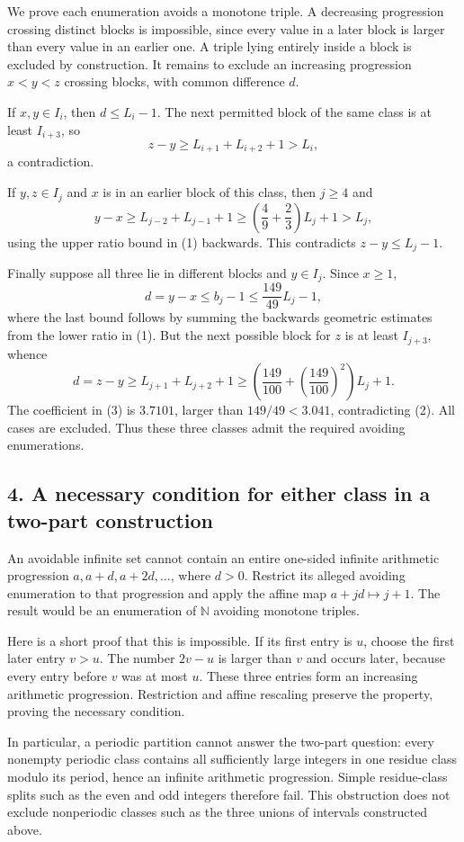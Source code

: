 We prove each enumeration avoids a monotone triple. A decreasing progression crossing distinct blocks is impossible, since every value in a later block is larger than every value in an earlier one. A triple lying entirely inside a block is excluded by construction. It remains to exclude an increasing progression $x<y<z$ crossing blocks, with common difference $d$.

If $x,y\in I_i$, then $d\le L_i-1$. The next permitted block of the same class is at least $I_{i+3}$, so
\[
 z-y\ge L_{i+1}+L_{i+2}+1>L_i,
\]
a contradiction.

If $y,z\in I_j$ and $x$ is in an earlier block of this class, then $j\ge4$ and
\[
 y-x\ge L_{j-2}+L_{j-1}+1
 \ge\left(\frac49+\frac23\right)L_j+1>L_j,
\]
using the upper ratio bound in (1) backwards. This contradicts $z-y\le L_j-1$.

Finally suppose all three lie in different blocks and $y\in I_j$. Since $x\ge1$,
\[
 d=y-x\le b_j-1
 \le\frac{149}{49}L_j-1,\tag{2}
\]
where the last bound follows by summing the backwards geometric estimates from the lower ratio in (1). But the next possible block for $z$ is at least $I_{j+3}$, whence
\[
 d=z-y\ge L_{j+1}+L_{j+2}+1
 \ge\left(\frac{149}{100}+\left(\frac{149}{100}\right)^2\right)L_j+1.
\tag{3}
\]
The coefficient in (3) is $3.7101$, larger than $149/49<3.041$, contradicting (2). All cases are excluded. Thus these three classes admit the required avoiding enumerations.

\subsection*{4. A necessary condition for either class in a two-part construction}
An avoidable infinite set cannot contain an entire one-sided infinite arithmetic progression $a,a+d,a+2d,\ldots$, where $d>0$. Restrict its alleged avoiding enumeration to that progression and apply the affine map $a+jd\mapsto j+1$. The result would be an enumeration of $\mathbb N$ avoiding monotone triples.

Here is a short proof that this is impossible. If its first entry is $u$, choose the first later entry $v>u$. The number $2v-u$ is larger than $v$ and occurs later, because every entry before $v$ was at most $u$. These three entries form an increasing arithmetic progression. Restriction and affine rescaling preserve the property, proving the necessary condition.

In particular, a periodic partition cannot answer the two-part question: every nonempty periodic class contains all sufficiently large integers in one residue class modulo its period, hence an infinite arithmetic progression. Simple residue-class splits such as the even and odd integers therefore fail. This obstruction does not exclude nonperiodic classes such as the three unions of intervals constructed above.

